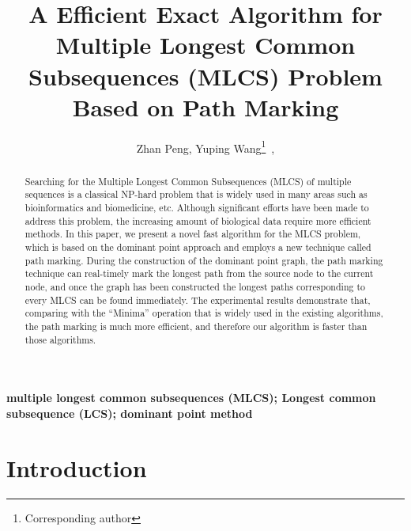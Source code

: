 \documentclass{article}
\begin{document}
\title{A Efficient Exact Algorithm for Multiple Longest Common
  Subsequences (MLCS) Problem Based on Path Marking}

\author{Zhan Peng, Yuping Wang\footnote{Corresponding author}~,}


\maketitle


\begin{abstract}

  Searching for the Multiple Longest Common Subsequences (MLCS) of
  multiple sequences is a classical NP-hard problem that is widely
  used in many areas such as bioinformatics and biomedicine,
  etc. Although significant efforts have been made to address this
  problem, the increasing amount of biological data require more
  efficient methods. In this paper, we present a novel fast algorithm
  for the MLCS problem, which is based on the dominant point approach
  and employs a new technique called path marking. During the
  construction of the dominant point graph, the path marking technique
  can real-timely mark the longest path from the source node to the
  current node, and once the graph has been constructed the longest
  paths corresponding to every MLCS can be found immediately. The
  experimental results demonstrate that, comparing with the ``Minima''
  operation that is widely used in the existing algorithms, the path
  marking is much more efficient, and therefore our algorithm is
  faster than those algorithms.

\end{abstract}

\textbf{multiple longest common subsequences (MLCS); Longest common
  subsequence (LCS); dominant point method}


\section{Introduction}
\label{sec:introduction}
\end{document}
